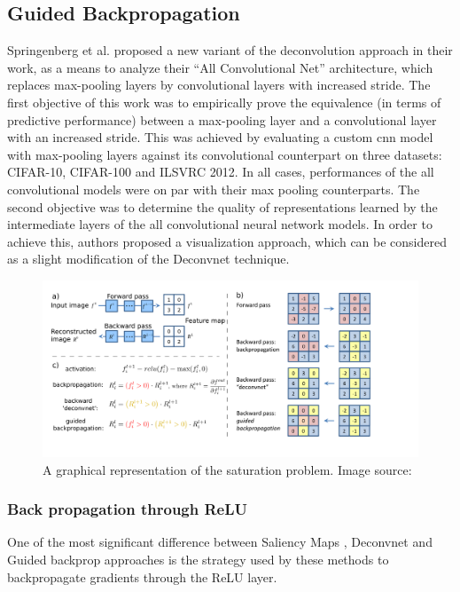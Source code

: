 \documentclass[../report.tex]{subfiles}
\begin{document}
 
 
 
 \subsection{Guided Backpropagation}
 Springenberg et al. proposed a new variant of the deconvolution approach in their work, as a means to analyze their \enquote{All Convolutional Net} architecture, which replaces max-pooling layers by convolutional layers with increased stride. The first objective of this work was to empirically prove the equivalence (in terms of predictive performance) between a max-pooling layer and a convolutional layer with an increased stride. This was achieved by evaluating a custom cnn model with max-pooling layers against its convolutional counterpart on three datasets: CIFAR-10, CIFAR-100 and ILSVRC 2012. In all cases, performances of the all convolutional models were on par with their max pooling counterparts. The second objective was to determine the quality of representations learned by the intermediate layers of the all convolutional neural network models. In order to achieve this, authors proposed a visualization  approach, which can be considered as a slight modification of the Deconvnet \cite{matthew2014visualizing} technique.
  \begin{figure}[H]
 	\centering
 	\includegraphics[scale=0.25]{images/chapter3/guided_backprop.png}
 	\caption{A graphical representation of the saturation problem. Image source: \cite{shrikumar2017learning}}
 	\label{fig_deep_lift2}
 \end{figure}
 
 \subsubsection{Back propagation through ReLU}
 One of the most significant difference between Saliency Maps \cite{simonyan2013deep}, Deconvnet \cite{matthew2014visualizing} and Guided backprop \cite{guided_backprop} approaches is the strategy used by these methods to backpropagate gradients through the ReLU layer. 
 
\end{document}
